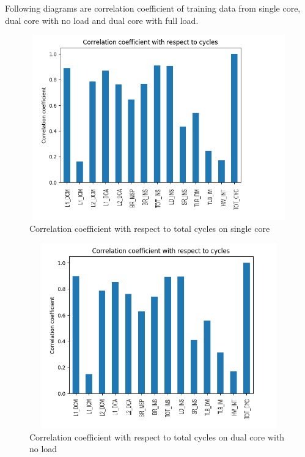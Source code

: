 \par Following diagrams are correlation coefficient of  training data from single core, dual core with no load and dual core with full load.

\begin{figure}[h!]
\includegraphics[width=12cm, height=8cm]{./images/CC_single}
\centering
\caption{Correlation coefficient with respect to total cycles on single core}
\label{fig:flow}
\end{figure}

\begin{figure}[h!]
\includegraphics[width=12cm, height=8cm]{./images/CC_no_load}
\centering
\caption{Correlation coefficient with respect to total cycles on dual  core with no load}
\label{fig:flow}
\end{figure}

